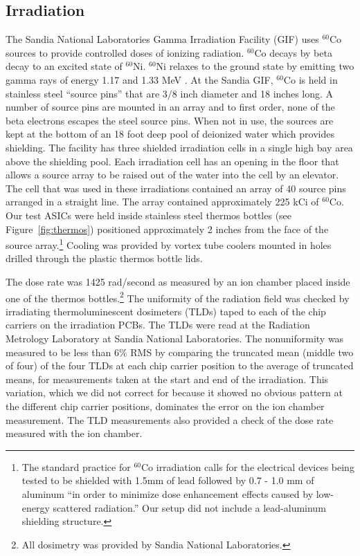 \subsection{Irradiation}
\label{ssec2_3}
The Sandia National Laboratories Gamma Irradiation Facility (GIF) uses $^{60}$Co sources to provide controlled doses of ionizing radiation.  $^{60}$Co decays by beta decay to an excited state of $^{60}$Ni. $^{60}$Ni relaxes to the ground state by emitting two gamma rays of energy 1.17 and 1.33 MeV \cite{pdg}.  At the Sandia GIF, $^{60}$Co is held in stainless steel ``source pins'' that are $3/8$ inch diameter and 18 inches long.  A number of source pins are mounted in an array and to first order, none of the beta electrons escapes the steel source pins.  When not in use, the sources are kept at the bottom of an 18 foot deep pool of deionized water which provides shielding.  The facility has three shielded irradiation cells in a single high bay area above the shielding pool.  Each irradiation cell has an opening in the floor that allows a source array to be raised out of the water into the cell by an elevator.  The cell that was used in these irradiations contained an array of 40 source pins arranged in a straight line.  The array contained approximately 225 kCi of $^{60}$Co.  Our test ASICs were held inside stainless steel thermos bottles (see Figure~\ref{fig:thermos}) positioned approximately 2 inches from the face of the source array.\footnote{The standard practice for $^{60}$Co irradiation calls for the electrical devices being tested to be shielded with 1.5mm of lead followed by 0.7 - 1.0 mm of aluminum\cite{ASTM standard F1892} ``in order to minimize dose enhancement effects caused by low-energy scattered radiation.'' Our setup did not include a lead-aluminum shielding structure.}  Cooling was provided by vortex tube coolers \cite{vortex} mounted in holes drilled through the plastic thermos bottle lids.  

The dose rate was 1425 rad/second as measured by an ion chamber placed inside one of the thermos bottles.\footnote{All dosimetry was provided by Sandia National Laboratories.}  The uniformity of the radiation field was checked by irradiating thermoluminescent dosimeters (TLDs) taped to each of the chip carriers on the irradiation PCBs.  The TLDs were read at the Radiation Metrology Laboratory at Sandia National Laboratories.  The nonuniformity was measured to be less than 6\% RMS by comparing the truncated mean (middle two of four) of the four TLDs at each chip carrier position to the average of truncated means, for measurements taken at the start and end of the irradiation.
This variation, which we did not correct for because it showed no obvious pattern at the different chip carrier positions, dominates the error on the ion chamber measurement.
The TLD measurements also provided a check of the dose rate measured with the ion chamber.

